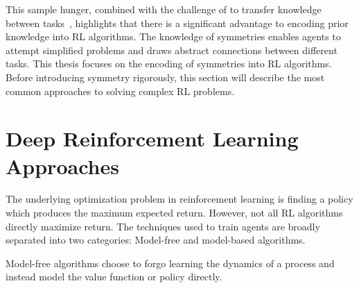This sample hunger, combined with the challenge of to transfer knowledge between tasks~\cite{kirkpatrick2017overcoming}, highlights that there is a significant advantage to encoding prior knowledge into RL algorithms. The knowledge of symmetries enables agents to attempt simplified problems and draws abstract connections between different tasks. This thesis focuses on the encoding of symmetries into RL algorithms. Before introducing symmetry rigorously, this section will describe the most common approaches to solving complex RL problems.

\section{Deep Reinforcement Learning Approaches}
The underlying optimization problem in reinforcement learning is finding a policy which produces the maximum expected return. However, not all RL algorithms directly maximize return. The techniques used to train agents are broadly separated into two categories: Model-free and model-based algorithms.

Model-free algorithms choose to forgo learning the dynamics of a process and instead model the value function or policy directly.


